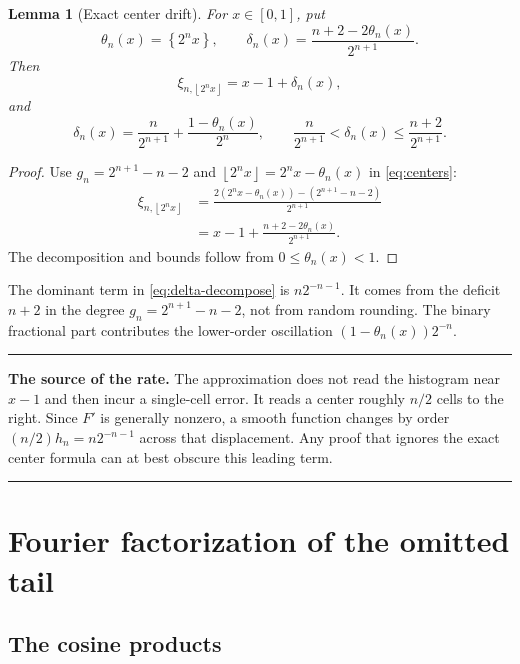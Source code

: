 \documentclass[11pt,oneside]{article}
\newtheorem{lemma}[theorem]{Lemma}
\theoremstyle{definition}
\theoremstyle{remark}
\newcommand{\floor}[1]{\left\lfloor #1\right\rfloor}
\newcommand{\fracpart}[1]{\left\{#1\right\}}
\newenvironment{boxedremark}{%
  \par\smallskip\noindent\begin{center}\begin{minipage}{0.94\textwidth}%
  \color{black}\hrule\vspace{0.6em}\small
}{%
  \vspace{0.6em}\hrule\end{minipage}\end{center}\smallskip
}
\begin{document}
\begin{lemma}[Exact center drift]
\label{lem:center-drift}
For $x\in[0,1]$, put
\begin{equation}
 \theta_n(x)=\fracpart{2^n x},
 \qquad
 \delta_n(x)=\frac{n+2-2\theta_n(x)}{2^{n+1}}.            \label{eq:delta-def}
\end{equation}
Then
\begin{equation}
 \xi_{n,\floor{2^n x}}=x-1+\delta_n(x),                   \label{eq:center-drift}
\end{equation}
and
\begin{equation}
 \delta_n(x)=\frac{n}{2^{n+1}}+
              \frac{1-\theta_n(x)}{2^n},
 \qquad
 \frac{n}{2^{n+1}}<\delta_n(x)\le\frac{n+2}{2^{n+1}}.    \label{eq:delta-decompose}
\end{equation}
\end{lemma}

\begin{proof}
Use $g_n=2^{n+1}-n-2$ and
$\floor{2^n x}=2^n x-\theta_n(x)$ in \eqref{eq:centers}:
\begin{align*}
 \xi_{n,\floor{2^n x}}
 &=\frac{2(2^n x-\theta_n(x))-(2^{n+1}-n-2)}{2^{n+1}}\\
 &=x-1+\frac{n+2-2\theta_n(x)}{2^{n+1}}.
\end{align*}
The decomposition and bounds follow from $0\le\theta_n(x)<1$.
\end{proof}

The dominant term in \eqref{eq:delta-decompose} is $n2^{-n-1}$.  It comes from
the deficit $n+2$ in the degree $g_n=2^{n+1}-n-2$, not from random rounding.
The binary fractional part contributes the lower-order oscillation
$(1-\theta_n(x))2^{-n}$.

\begin{boxedremark}
\textbf{The source of the rate.}
The approximation does not read the histogram near $x-1$ and then incur a
single-cell error.  It reads a center roughly $n/2$ cells to the right.  Since
$F'$ is generally nonzero, a smooth function changes by order
$(n/2)h_n=n2^{-n-1}$ across that displacement.  Any proof that ignores the exact
center formula can at best obscure this leading term.
\end{boxedremark}

\section{Fourier factorization of the omitted tail}
\label{sec:tail-kernel}

\subsection{The cosine products}
\end{document}

